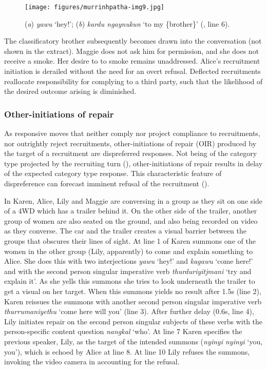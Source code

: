 \documentclass[output=paper,nonflat,colorlinks,citecolor=brown]{langsci/langscibook}
\begin{document}
\begin{figure}
\texttt{[image: figures/murrinhpatha-img9.jpg]}
\caption{
(\textit{a}) \textit{yawu} ‘hey!’; (\textit{b}) \textit{kardu ngaynukun} ‘to my \{brother\}’ (, line 6).
\label{fig:blythe:9}}\end{figure}

The classificatory brother subsequently becomes drawn into the conversation (not shown in the extract). Maggie does not ask him for permission, and she does not receive a smoke. Her desire to to smoke remains unaddressed. Alice’s recruitment initiation is derailed without the need for an overt refusal. Deflected recruitments reallocate responsibility for complying to a third party, such that the likelihood of the desired outcome arising is diminished.

\subsubsection{Other-initiations of repair}\label{sec:blythe:4.2.3}

As responsive moves that neither comply nor project compliance to recruitments, nor outrightly reject recruitments, other-initiations of repair (OIR) produced by the target of a recruitment are dispreferred responses. Not being of the category type projected by the recruiting turn (\citealt{Raymond2003,HeritageRaymond2012}), other-initiations of repair results in delay of the expected category type response. This characteristic feature of dispreference can forecast imminent refusal of the recruitment (\citealt[380]{schegloff_preference_1977}).

In  Karen, Alice, Lily and Maggie are conversing in a group as they sit on one side of a 4WD which has a trailer behind it. On the other side of the trailer, another group of women are also seated on the ground, and also being recorded on video as they converse. The car and the trailer creates a visual barrier between the groups that obscures their lines of sight. At line 1 of  Karen summons one of the women in the other group (Lily, apparently) to come and explain something to Alice. She does this with two interjections \textit{yawu} ‘hey!’ and \textit{kagawu} ‘come here!’ and with the second person singular imperative verb \textit{thurduriyitjmani} ‘try and explain it’. As she yells this summons she tries to look underneath the trailer to get a visual on her target. When this summons yields no result after 1.5s (line 2), Karen reissues the summons with another second person singular imperative verb \textit{thurrumaniyethu} ‘come here will you’ (line 3). After further delay (0.6s, line 4), Lily initiates repair on the second person singular subjects of these verbs with the person-specific content question \textit{nangkal} ‘who’. At line 7 Karen specifies the previous speaker, Lily, as the target of the intended summons (\textit{nyinyi nyinyi} ‘you, you’), which is echoed by Alice at line 8. At line 10 Lily refuses the summons, invoking the video camera in accounting for the refusal.
\end{document}
